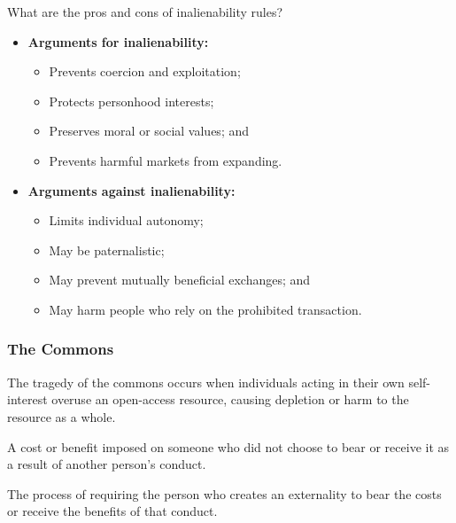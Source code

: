 \documentclass[11pt]{tex/lawoutline}
\begin{document}
\question
{What are the pros and cons of inalienability rules?}
{
\begin{itemize}
    \item \textbf{Arguments for inalienability:}
    \begin{itemize}
        \item Prevents coercion and exploitation;
        \item Protects personhood interests;
        \item Preserves moral or social values; and
        \item Prevents harmful markets from expanding.
    \end{itemize}
    
    \item \textbf{Arguments against inalienability:}
    \begin{itemize}
        \item Limits individual autonomy;
        \item May be paternalistic;
        \item May prevent mutually beneficial exchanges; and
        \item May harm people who rely on the prohibited transaction.
    \end{itemize}
\end{itemize}
}


\subsubsection{The Commons}

{
The tragedy of the commons occurs when individuals acting in their own self-interest overuse an open-access resource, causing depletion or harm to the resource as a whole.
}

{
A cost or benefit imposed on someone who did not choose to bear or receive it as a result of another person's conduct.
}

{
The process of requiring the person who creates an externality to bear the costs or receive the benefits of that conduct.
}
\end{document}

